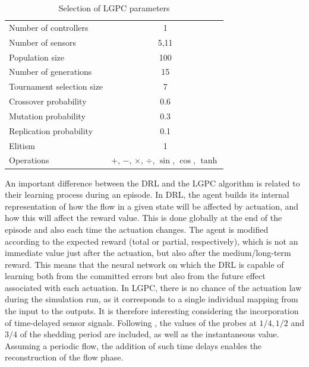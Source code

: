 \begin{table}[h]
    \centering
    \begin{tabular}{lc}
    \toprule
    Number of controllers                       & 1 \\
    Number of sensors                           & 5,11 \\
    Population size                             & 100 \\
    Number of generations                       & 15 \\ %
    Tournament selection size                   & 7   \\ 
    Crossover probability                       & 0.6 \\ 
    Mutation probability                        & 0.3 \\
    Replication probability                     & 0.1 \\
    Elitism                                     & 1   \\
    Operations                                  & $+$, $-$, $\times$, $\div$, $\sin$, $\cos$, $\tanh$ \\ \bottomrule
    \end{tabular}
    \caption{Selection of LGPC parameters} \label{tab:GAparameters}
\end{table}

An important difference between the DRL and the LGPC algorithm is related to their learning process during an episode. In DRL, the agent builds its internal representation of how the flow in a given state will be affected by actuation, and how this will affect the reward value. This is done globally at the end of the episode and also each time the actuation changes. The agent is modified according to the expected reward (total or partial, respectively), which is not an immediate value just after the actuation, but also after the medium/long-term reward. This means that the neural network on which the DRL is capable of learning both from the committed errors but also from the future effect associated with each actuation. In LGPC, there is no chance of the actuation law during the simulation run, as it corresponds to a single individual mapping from the input to the outputs. It is therefore interesting considering the incorporation of time-delayed sensor signals. Following \citet{cornejo2021gMLC}, the values of the probes at $1/4, 1/2$ and $3/4$ of the shedding period are included, as well as the instantaneous value. Assuming a periodic flow, the addition of such time delays enables the reconstruction of the flow phase.

